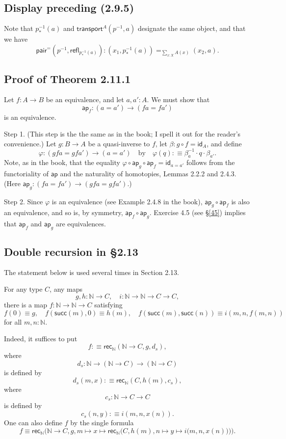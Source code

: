 \documentclass[12pt]{article}
\newcommand{\ap}{\mathsf{ap}}
\newcommand{\id}{\mathsf{id}}
\newcommand{\N}{\mathbb N}
\newcommand{\pa}{\mathsf{pair}^=}
\newcommand{\rec}{\mathsf{rec}}
\newcommand{\refl}{\mathsf{refl}}
\newcommand{\su}{\mathsf{succ}}
\newcommand{\tr}{\mathsf{transport}}
\begin{document}

\subsection{Display preceding (2.9.5)}

Note that $p^{-1}_*(a)$ and $\tr^A(p^{-1},a)$ designate the same object, and that we have 
$$
\pa(p^{-1},\refl_{p^{-1}_*(a)}):(x_1,p^{-1}_*(a))=_{\sum_{x:X}A(x)}(x_2,a).
$$


\subsection{Proof of Theorem 2.11.1}\label{2111}

Let $f:A\to B$ be an equivalence, and let $a,a':A$. We must show that 
$$
\ap_f:(a=a')\to (fa=fa')
$$ 
is an equivalence.

Step 1. (This step is the the same as in the book; I spell it out for the reader's convenience.) Let $g:B\to A$ be a quasi-inverse to $f$, let $\beta:g\circ f=\id_A$, and define 
$$
\varphi:(gfa=gfa')\to(a=a')\quad\text{by}\quad\varphi(q):\equiv\beta_a^{-1}\cdot q\cdot\beta_{a'}.
$$ 
Note, as in the book, that the equality $\varphi\circ\ap_g\circ\ap_f=\id_{a=a'}$ follows from the functoriality of $\ap$ and the naturality of homotopies, Lemmas 2.2.2 and 2.4.3. (Here $\ap_g:(fa=fa')\to (gfa=gfa')$.)

Step 2. Since $\varphi$ is an equivalence (see Example 2.4.8 in the book), $\ap_g\circ\ap_f$ is also an equivalence, and so is, by symmetry, $\ap_f\circ\ap_g$. Exercise 4.5 (see \S\ref{45}) implies that $\ap_f$ and $\ap_g$ are equivalences.



\subsection{Double recursion in \S2.13}

The statement below is used several times in Section 2.13.

For any type $C$, any maps 
$$
g,h:\N\to C,\quad i:\N\to\N\to C\to C,
$$ 
there is a map $f:\N\to\N\to C$ satisfying 
$$
f(0)\equiv g,\quad f(\su(m),0)\equiv h(m),\quad f(\su(m),\su(n))\equiv i(m,n,f(m,n))
$$ 
for all $m,n:\N$.

Indeed, it suffices to put 
$$
f:\equiv\rec_\N(\N\to C,g,d_s),
$$ 
where 
$$
d_s:\N\to(\N\to C)\to(\N\to C)
$$ 
is defined by 
$$
d_s(m,x):\equiv\rec_\N(C,h(m),c_s),
$$ 
where 
$$
c_s:\N\to C\to C
$$ 
is defined by 
$$
c_s(n,y):\equiv i(m,n,x(n)).
$$ 
One can also define $f$ by the single formula
$$
f\equiv\rec_\N\Bigg(\N\to C,g,m\mapsto x\mapsto\rec_\N\bigg(C,h(m),n\mapsto y\mapsto i\big(m,n,x(n)\big)\bigg)\Bigg).
$$
\end{document}
